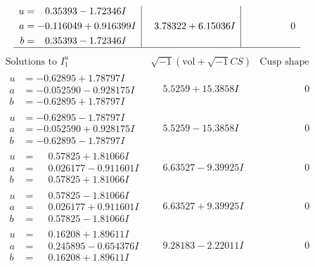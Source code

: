 \documentclass[1p]{elsarticle_modified}
\theoremstyle{definition}
\newcommand{\I}{\sqrt{-1}}
\begin{document}
$$\begin{array}{c|c|c}
\begin{aligned}
u &= \phantom{-}0.35393 - 1.72346 I \\
a &= -0.116049 + 0.916399 I \\
b &= \phantom{-}0.35393 - 1.72346 I\end{aligned}
 & \phantom{-}3.78322 + 6.15036 I & \phantom{-0.000000 } 0\\
 \hline 
 \end{array}$$\newpage$$\begin{array}{c|c|c}  
\text{Solutions to }I^u_{1}& \I (\text{vol} + \sqrt{-1}CS) & \text{Cusp shape}\\
 \hline 
\begin{aligned}
u &= -0.62895 + 1.78797 I \\
a &= -0.052590 - 0.928175 I \\
b &= -0.62895 + 1.78797 I\end{aligned}
 & \phantom{-}5.5259 + 15.3858 I & \phantom{-0.000000 } 0 \\ \hline\begin{aligned}
u &= -0.62895 - 1.78797 I \\
a &= -0.052590 + 0.928175 I \\
b &= -0.62895 - 1.78797 I\end{aligned}
 & \phantom{-}5.5259 - 15.3858 I & \phantom{-0.000000 } 0 \\ \hline\begin{aligned}
u &= \phantom{-}0.57825 + 1.81066 I \\
a &= \phantom{-}0.026177 - 0.911601 I \\
b &= \phantom{-}0.57825 + 1.81066 I\end{aligned}
 & \phantom{-}6.63527 - 9.39925 I & \phantom{-0.000000 } 0 \\ \hline\begin{aligned}
u &= \phantom{-}0.57825 - 1.81066 I \\
a &= \phantom{-}0.026177 + 0.911601 I \\
b &= \phantom{-}0.57825 - 1.81066 I\end{aligned}
 & \phantom{-}6.63527 + 9.39925 I & \phantom{-0.000000 } 0 \\ \hline\begin{aligned}
u &= \phantom{-}0.16208 + 1.89611 I \\
a &= \phantom{-}0.245895 - 0.654376 I \\
b &= \phantom{-}0.16208 + 1.89611 I\end{aligned}
 & \phantom{-}9.28183 - 2.22011 I & \phantom{-0.000000 } 0 \\ \hline\begin{aligned}

\end{aligned}
\end{array}$$
\end{document}
